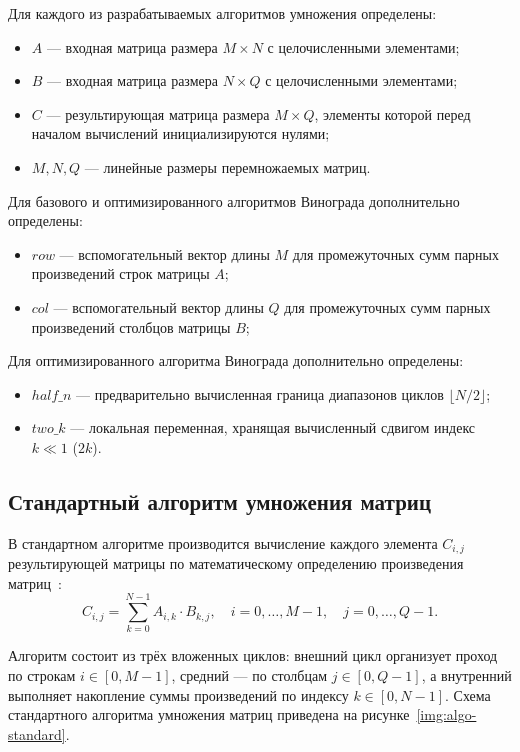 Для каждого из разрабатываемых алгоритмов умножения определены:
\begin{itemize}
    \item $A$ --- входная матрица размера $M \times N$ с целочисленными элементами;
    \item $B$ --- входная матрица размера $N \times Q$ с целочисленными элементами;
    \item $C$ --- результирующая матрица размера $M \times Q$, элементы которой перед началом вычислений инициализируются нулями;
    \item $M, N, Q$ --- линейные размеры перемножаемых матриц.
\end{itemize}

Для базового и оптимизированного алгоритмов Винограда дополнительно определены:
\begin{itemize}
    \item $row$ --- вспомогательный вектор длины $M$ для промежуточных сумм парных произведений строк матрицы $A$;
    \item $col$ --- вспомогательный вектор длины $Q$ для промежуточных сумм парных произведений столбцов матрицы $B$;
\end{itemize}

Для оптимизированного алгоритма Винограда дополнительно определены:
\begin{itemize}
    \item $half\_n$ --- предварительно вычисленная граница диапазонов циклов $\lfloor N / 2 \rfloor$;
    \item $two\_k$ --- локальная переменная, хранящая вычисленный сдвигом индекс $k \ll 1$ ($2k$).
\end{itemize}

\subsection{Стандартный алгоритм умножения матриц}

В стандартном алгоритме производится вычисление каждого элемента $C_{i,j}$ результирующей матрицы по математическому определению произведения матриц~\cite{cormen}:
\begin{equation}
    C_{i,j} = \sum_{k=0}^{N-1} A_{i,k} \cdot B_{k,j}, \quad i = 0, \ldots, M-1, \quad j = 0, \ldots, Q-1.
\end{equation}

Алгоритм состоит из трёх вложенных циклов: внешний цикл организует проход по строкам $i \in [0, M - 1]$, средний --- по столбцам $j \in [0, Q - 1]$, а внутренний выполняет накопление суммы произведений по индексу $k \in [0, N - 1]$. Схема стандартного алгоритма умножения матриц приведена на рисунке~\ref{img:algo-standard}.

